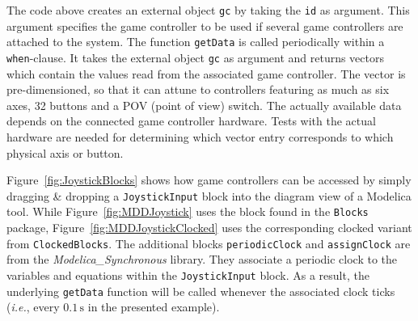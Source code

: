 \documentclass{resources/modelica}
\newcommand{\modelica}[1]{\lstinline[language=modelica]|#1|}
\begin{document}
\noindent
The code above creates an external object \modelica{gc} by taking the \modelica{id} as argument. This
argument specifies the game controller to be used if several game controllers are attached to the
system. The function \modelica{getData} is called periodically within a
\modelica{when}-clause. It takes the external object \modelica{gc} as
argument and returns vectors which contain the values read from the
associated game controller. The vector is pre-dimensioned, so that it can attune
to controllers featuring as much as six axes, 32 buttons and a POV (point of
view) switch. The actually available data depends on the connected game
controller hardware. Tests with the actual hardware are needed for determining
which vector entry corresponds to which physical axis or button.

Figure~\ref{fig:JoystickBlocks} shows how game controllers can be accessed by
simply dragging \& dropping a \modelica{JoystickInput} block into the diagram
view of a Modelica tool. While Figure~\ref{fig:MDDJoystick} uses the block found
in the \modelica{Blocks} package,
Figure~\ref{fig:MDDJoystickClocked} uses the corresponding clocked variant from
\modelica{ClockedBlocks}. The additional blocks \modelica{periodicClock} and
\modelica{assignClock} are from the \emph{Modelica\_Synchronous} library. They
associate a periodic clock to the variables and equations within the
\modelica{JoystickInput} block. As a result, the underlying
\modelica{getData} function will be called whenever the
associated clock ticks (\textit{i.e.}, every $0.1\,\mathrm{s}$ in the presented
example).
\end{document}

